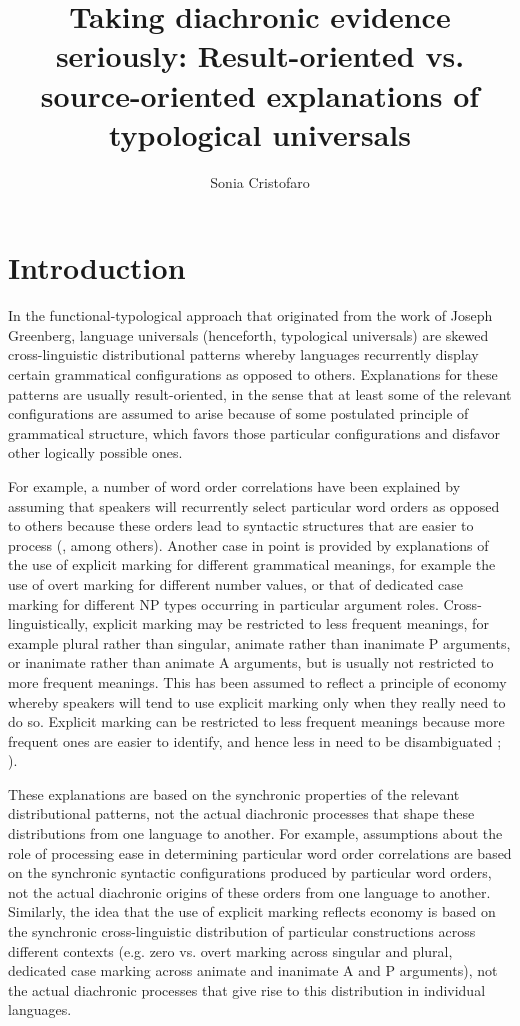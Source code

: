 \documentclass[output=paper]{langsci/langscibook}
\author{Sonia Cristofaro\affiliation{University of Pavia}}
\title{Taking diachronic evidence seriously: Result-oriented
  vs. source-oriented explanations of typological universals}
\begin{document}
\maketitle 
  
 
 

\section{Introduction}\label{intro}
In the functional-typological approach that originated from the work
of Joseph Greenberg, language universals (henceforth, typological
universals) are skewed cross-linguistic
  distributional patterns whereby languages recurrently display
  certain grammatical configurations as opposed to others. Explanations for these patterns are usually result-oriented, in the 
sense  that at least some of the relevant configurations are assumed
to arise because of some postulated principle of grammatical
structure, which favors those particular configurations and disfavor
other logically possible ones.

For example, a
  number of word order correlations have been explained by assuming that
speakers will recurrently select particular word orders as opposed
  to others because these orders lead to syntactic structures that are
  easier to process (\citealt{Hawkins2004},  among others). Another case in point is
  provided by explanations of the use of explicit marking for
  different grammatical meanings, for example the
  use of overt marking for different number values, or that of 
 dedicated case marking for different NP types
occurring in particular argument roles. Cross-linguistically, explicit
marking may be restricted to less frequent meanings, for example plural rather than singular, animate rather than
inanimate P arguments, or inanimate rather than animate A arguments, but
is usually not restricted to more frequent meanings. This has been assumed to reflect 
a principle of economy whereby
speakers will tend to use explicit marking only when they really need
to do so. Explicit marking can be restricted to less frequent meanings
because more frequent ones are easier to identify, and hence less in
need to be disambiguated
\citep{Greenberg1966,Corbett2000,TU2};
\citealt{Martinmarkedness,Haspelmath2008}). 

These explanations are based on the synchronic properties of the
relevant distributional patterns, not the actual diachronic processes
that shape these distributions from one language to another. For
example, assumptions about the role of
processing ease in determining particular word order correlations are based on the synchronic syntactic configurations
  produced by particular word orders, not the actual diachronic
  origins of these orders from one language to
  another. Similarly, the idea that the use of explicit marking reflects economy is based on
the synchronic cross-linguistic distribution of particular
constructions across different contexts (e.g. zero vs. overt marking
across singular and plural, dedicated case marking across animate and
inanimate A and P arguments), not the actual diachronic processes that give rise to this distribution in
individual languages. 
\end{document}

